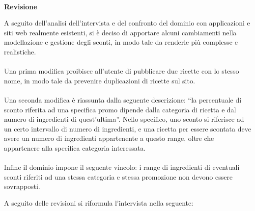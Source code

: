 \textbf{\\Revisione}

A seguito dell’analisi dell’intervista e del confronto del dominio con applicazioni e siti web realmente esistenti, si è deciso di apportare alcuni cambiamenti nella modellazione e gestione degli sconti, in modo tale da renderle più complesse e realistiche. 
\\\\Una prima modifica proibisce all’utente di pubblicare due ricette con lo stesso nome, in modo tale da prevenire duplicazioni di ricette sul sito.
\\\\Una seconda modifica è riassunta dalla seguente descrizione: “la percentuale di sconto riferita ad una specifica promo dipende dalla categoria di ricetta e dal numero di ingredienti di quest’ultima”.
Nello specifico, uno sconto si riferisce ad un certo intervallo di numero di ingredienti, e una ricetta per essere scontata deve avere un numero di ingredienti appartenente a questo range, oltre che appartenere alla specifica categoria interessata.
\\\\Infine il dominio impone il seguente vincolo: i range di ingredienti di eventuali sconti riferiti ad una stessa categoria e stessa promozione non devono essere sovrapposti.

A seguito delle revisioni si riformula l’intervista nella seguente:

